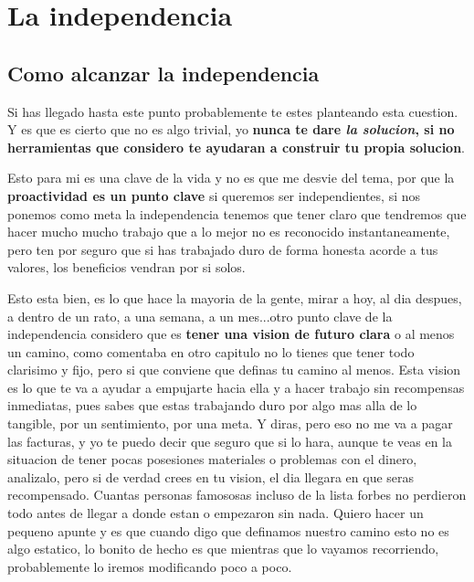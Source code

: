 \chapter{La independencia}
\section{Como alcanzar la independencia}
Si has llegado hasta este punto probablemente te estes planteando esta cuestion. Y es que es cierto que no es algo trivial, yo \textbf{nunca te dare \textit{la solucion}, si no herramientas que considero te ayudaran a construir tu propia solucion}.

Esto para mi es una clave de la vida y no es que me desvie del tema, por que la \textbf{proactividad es un punto clave} si queremos ser independientes, si nos ponemos como meta la independencia tenemos que tener claro que tendremos que hacer mucho mucho trabajo que a lo mejor no es reconocido instantaneamente, pero ten por seguro que si has trabajado duro de forma honesta acorde a tus valores, los beneficios vendran por si solos.

Esto esta bien, es lo que hace la mayoria de la gente, mirar a hoy, al dia despues, a dentro de un rato, a una semana, a un mes...otro punto clave de la independencia considero que es \textbf{tener una vision de futuro clara} o al menos un camino, como comentaba en otro capitulo no lo tienes que tener todo clarisimo y fijo, pero si que conviene que definas tu camino al menos. Esta vision es lo que te va a ayudar a empujarte hacia ella y a hacer trabajo sin recompensas inmediatas, pues sabes que estas trabajando duro por algo mas alla de lo tangible, por un sentimiento, por una meta. Y diras, pero eso no me va a pagar las facturas, y yo te puedo decir que seguro que si lo hara, aunque te veas en la situacion de tener pocas posesiones materiales o problemas con el dinero, analizalo, pero si de verdad crees en tu vision, el dia llegara en que seras recompensado. Cuantas personas famososas incluso de la lista forbes no perdieron todo antes de llegar a donde estan o empezaron sin nada. Quiero hacer un pequeno apunte y es que cuando digo que definamos nuestro camino esto no es algo estatico, lo bonito de hecho es que mientras que lo vayamos recorriendo, probablemente lo iremos modificando poco a poco.

